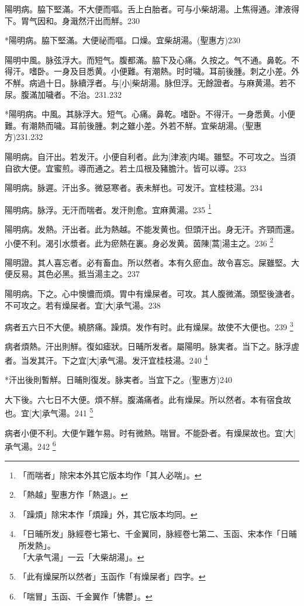 \documentclass[12pt,twoside,UTF8,b5paper]{ctexbook}
\begin{document}
陽明病。脇下堅滿。不大便而嘔。舌上白胎者。可与小柴胡湯。上焦得通。津液得下。胃气因和。身濈然汗出而觧。230

*陽明病。脇下堅滿。大便祕而嘔。口燥。宜柴胡湯。(聖惠方)230

陽明中風。脉弦浮大。而短气。腹都滿。脇下及心痛。久按之。气不通。鼻乾。不得汗。嗜卧。一身及目悉黄。小便難。有潮熱。时时噦。耳前後腫。刺之小差。外不觧。病過十日。脉續浮者。与[小]柴胡湯。脉但浮。无餘證者。与麻黄湯。若不尿。腹滿加噦者。不治。231.232

*陽明病。中風。其脉浮大。短气。心痛。鼻乾。嗜卧。不得汗。一身悉黄。小便難。有潮熱而噦。耳前後腫。刺之雖小差。外若不觧。宜柴胡湯。(聖惠方)231.232

陽明病。自汗出。若发汗。小便自利者。此为[津液]内竭。雖堅。不可攻之。当須自欲大便。宜蜜煎。導而通之。若土瓜根及豬膽汁。皆可以導。233

陽明病。脉遲。汗出多。微惡寒者。表未觧也。可发汗。宜桂枝湯。234

陽明病。脉浮。无汗而喘者。发汗則愈。宜麻黄湯。235
	\footnote{「而喘者」除宋本外其它版本均作「其人必喘」。}

陽明病。发熱。汗出者。此为熱越。不能发黄也。但頭汗出。身无汗。齐頸而還。小便不利。渴引水漿者。此为瘀熱在裏。身必发黄。茵陳[蒿]湯主之。236
	\footnote{「熱越」聖惠方作「熱退」。}

陽明證。其人喜忘者。必有畜血。所以然者。本有久瘀血。故令喜忘。屎雖堅。大便反易。其色必黑。抵当湯主之。237

陽明病。下之。心中懊憹而煩。胃中有燥屎者。可攻。其人腹微滿。頭堅後溏者。不可攻之。若有燥屎者。宜[大]承气湯。238

病者五六日不大便。繞脐痛。躁煩。发作有时。此有燥屎。故使不大便也。239
	\footnote{「躁煩」除宋本作「煩躁」外，其它版本均同。}

病者煩熱。汗出則觧。復如瘧狀。日晡所发者。屬陽明。脉実者。当下之。脉浮虗者。当发其汗。下之宜[大]承气湯。发汗宜桂枝湯。240
	\footnote{「日晡所发」脉經卷七第七、千金翼同，脉經卷七第二、玉函、宋本作「日晡所发熱」。\\「大承气湯」一云「大柴胡湯」。}

*汗出後則暫觧。日晡則復发。脉実者。当宜下之。(聖惠方)240

大下後。六七日不大便。煩不觧。腹滿痛者。此有燥屎。所以然者。本有宿食故也。宜[大]承气湯。241
	\footnote{「此有燥屎所以然者」玉函作「有燥屎者」四字。}

病者小便不利。大便乍難乍易。时有微熱。喘冒。不能卧者。有燥屎故也。宜[大]承气湯。242
	\footnote{「喘冒」玉函、千金翼作「怫鬱」。}
\end{document}
